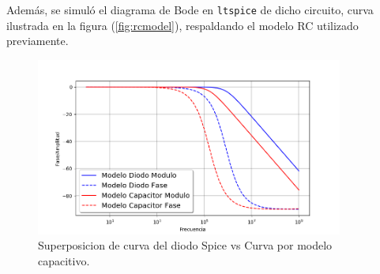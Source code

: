 \documentclass[a4paper]{article}
\begin{document}
Además, se simuló el diagrama de Bode en \texttt{ltspice} de dicho circuito, curva ilustrada en la figura (\ref{fig:rcmodel}), respaldando el modelo RC utilizado previamente.

\begin{figure}[H]
	\centering
	\includegraphics[width=0.9\textwidth]{capVsDiodo.png}	
	\caption{Superposicion de curva del diodo Spice vs Curva por modelo capacitivo.}
	\label{fig:rtaf}
\end{figure}
\end{document}
